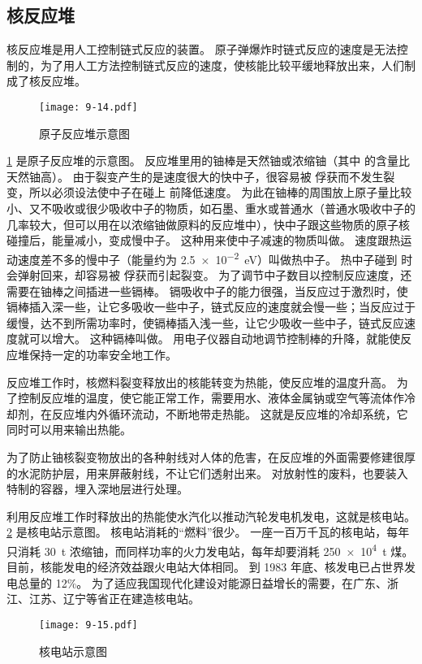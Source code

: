 \subsection{核反应堆}
核反应堆是用人工控制链式反应的装置。
原子弹爆炸时链式反应的速度是无法控制的，为了用人工方法控制链式反应的速度，使核能比较平缓地释放出来，人们制成了核反应堆。
\begin{figure}
  \texttt{[image: 9-14.pdf]}
  \caption{原子反应堆示意图}\label{fig:9-14}
\end{figure}

\cref{fig:9-14} 是原子反应堆的示意图。
反应堆里用的铀棒是天然铀或浓缩铀（其中  的含量比天然铀高）。
由于裂变产生的是速度很大的快中子，很容易被  俘获而不发生裂变，所以必须设法使中子在碰上  前降低速度。
为此在铀棒的周围放上原子量比较小、又不吸收或很少吸收中子的物质，如石墨、重水或普通水（普通水吸收中子的几率较大，但可以用在以浓缩铀做原料的反应堆中），快中子跟这些物质的原子核碰撞后，能量减小，变成慢中子。
这种用来使中子减速的物质叫做。
速度跟热运动速度差不多的慢中子（能量约为 \qty{2.5e-2}{eV}）叫做热中子。
热中子碰到  时会弹射回来，却容易被  俘获而引起裂变。
为了调节中子数目以控制反应速度，还需要在铀棒之间插进一些镉棒。
镉吸收中子的能力很强，当反应过于激烈时，使镉棒插入深一些，让它多吸收一些中子，链式反应的速度就会慢一些；当反应过于缓慢，达不到所需功率时，使镉棒插入浅一些，让它少吸收一些中子，链式反应速度就可以增大。
这种镉棒叫做。
用电子仪器自动地调节控制棒的升降，就能使反应堆保持一定的功率安全地工作。

反应堆工作时，核燃料裂变释放出的核能转变为热能，使反应堆的温度升高。
为了控制反应堆的温度，使它能正常工作，需要用水、液体金属钠或空气等流体作冷却剂，在反应堆内外循环流动，不断地带走热能。
这就是反应堆的冷却系统，它同时可以用来输出热能。

为了防止铀核裂变物放出的各种射线对人体的危害，在反应堆的外面需要修建很厚的水泥防护层，用来屏蔽射线，不让它们透射出来。
对放射性的废料，也要装入特制的容器，埋入深地层进行处理。

利用反应堆工作时释放出的热能使水汽化以推动汽轮发电机发电，这就是核电站。\cref{fig:9-15} 是核电站示意图。
核电站消耗的“燃料”很少。
一座一百万千瓦的核电站，每年只消耗 \qty{30}{t} 浓缩铀，而同样功率的火力发电站，每年却要消耗 \qty{250e4}{t} 煤。
目前，核能发电的经济效益跟火电站大体相同。
到 1983 年底、核发电已占世界发电总量的 12\%。
为了适应我国现代化建设对能源日益增长的需要，在广东、浙江、江苏、辽宁等省正在建造核电站。

\begin{figure}
  \texttt{[image: 9-15.pdf]}
  \caption{核电站示意图}\label{fig:9-15}
\end{figure}

